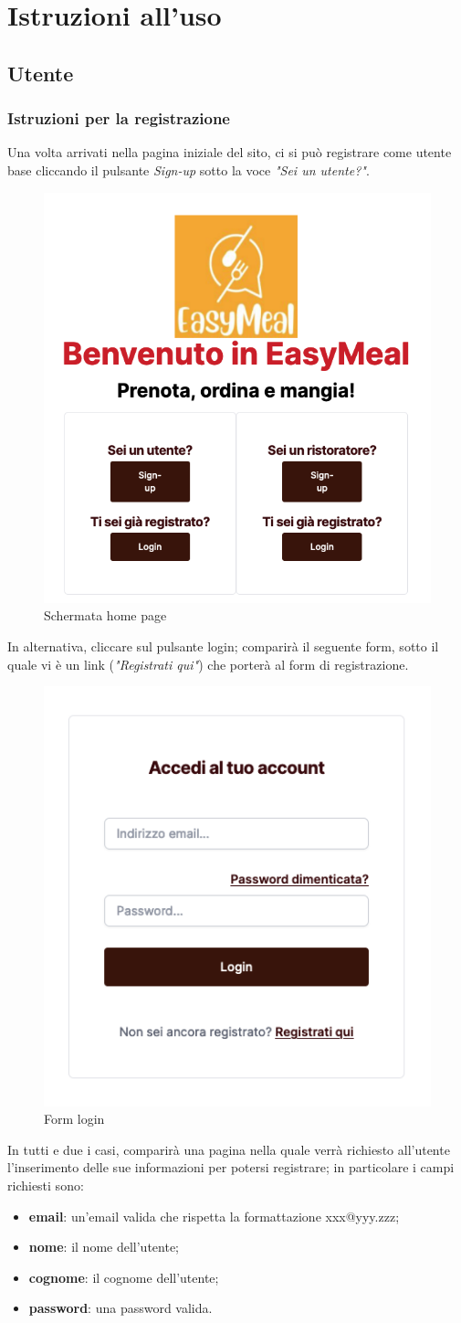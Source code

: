 \section{Istruzioni all'uso}
\subsection{Utente}
\subsubsection{Istruzioni per la registrazione}

Una volta arrivati nella pagina iniziale del sito, ci si può registrare come utente base cliccando il pulsante \emph{Sign-up} sotto la voce \emph{"Sei un utente?"}.
\begin{figure}[H]
    \centering
    \includegraphics[width=0.5\linewidth]{img/schermata_iniziale.png}
    \caption{Schermata home page}
    \label{fig:schermata_iniziale}
\end{figure}
In alternativa, cliccare sul pulsante login; comparirà il seguente form, sotto il quale vi è un link (\emph{"Registrati qui"}) che porterà al form di registrazione.
\begin{figure}[H]
    \centering
    \includegraphics[width=0.3\linewidth]{img/form_login.png}
    \caption{Form login}
    \label{fig:form_login}
\end{figure}
In tutti e due i casi, comparirà una pagina nella quale verrà richiesto all'utente l'inserimento delle sue informazioni per potersi registrare; in particolare i campi richiesti sono: 
\begin{itemize}
    \item \textbf{email}: un'email valida che rispetta la formattazione xxx@yyy.zzz;
    \item \textbf{nome}: il nome dell'utente;
    \item \textbf{cognome}: il cognome dell'utente;
    \item \textbf{password}: una password valida.
\end{itemize}

